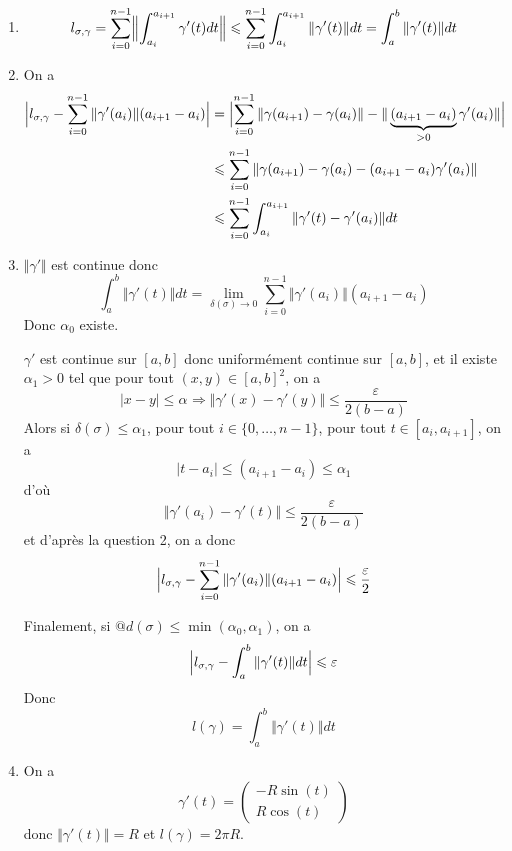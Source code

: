 \begin{solution}
	\phantom{}
	\begin{enumerate}
		\item 
		$$l_{\sigma,\gamma}=\sum_{i=0}^{n-1}\Bigl\Vert\int_{a_{i}}^{a_{i+1}}\gamma'(t)dt\Bigr\Vert\leqslant\sum_{i=0}^{n-1}\int_{a_{i}}^{a_{i+1}}\Vert\gamma'(t)\Vert dt=\int_{a}^{b}\Vert\gamma'(t)\Vert dt$$

		\item On a 
		\begin{align*}
			\Bigl\vert l_{\sigma,\gamma}-\sum_{i=0}^{n-1}\Vert\gamma'(a_{i})\Vert(a_{i+1}-a_{i})\Bigr\vert
			&=\Bigl\vert\sum_{i=0}^{n-1}\Vert\gamma(a_{i+1})-\gamma(a_{i})\Vert-\Vert\underbrace{(a_{i+1}-a_{i})}_{>0}\gamma'(a_{i})\Vert\Bigr\vert\\
			&\leqslant\sum_{i=0}^{n-1}\Vert\gamma(a_{i+1})-\gamma(a_{i})-(a_{i+1}-a_{i})\gamma'(a_{i})\Vert\\
			&\leqslant\sum_{i=0}^{n-1}\int_{a_{i}}^{a_{i+1}}\Vert\gamma'(t)-\gamma'(a_{i})\Vert dt
		\end{align*}

		\item $\Vert\gamma'\Vert$ est continue donc 
		$$\int_{a}^{b}\Vert\gamma'(t)\Vert dt=\lim\limits_{\delta(\sigma)\to0}\sum_{i=0}^{n-1}\Vert\gamma'(a_{i})\Vert(a_{i+1}-a_{i})$$
		Donc $\alpha_{0}$ existe.

		$\gamma'$ est continue sur $[a,b]$ donc uniformément continue sur $[a,b]$, et il existe $\alpha_{1}>0$ tel que pour tout $(x,y)\in[a,b]^{2}$, on a 
		$$\vert x-y\vert\leqslant\alpha_{}\Rightarrow\Vert\gamma'(x)-\gamma'(y)\Vert\leqslant\frac{\varepsilon}{2(b-a)}$$
		Alors si $\delta(\sigma)\leqslant\alpha_{1}$, pour tout $i\in\{0,\dots,n-1\}$, pour tout $t\in[a_{i},a_{i+1}]$, on a
		$$\vert t-a_{i}\vert\leqslant(a_{i+1}-a_{i})\leqslant\alpha_{1}$$
		d'où 
		$$\Vert \gamma'(a_{i})-\gamma'(t)\Vert\leqslant\frac{\varepsilon}{2(b-a)}$$
		et d'après la question 2, on a donc 
		$$\Bigl\vert l_{\sigma,\gamma}-\sum_{i=0}^{n-1}\Vert\gamma'(a_{i})\Vert(a_{i+1}-a_{i})\Bigr\vert\leqslant\frac{\varepsilon}{2}$$

		Finalement, si $@d(\sigma)\leqslant\min(\alpha_{0},\alpha_{1})$, on a 
		$$\Bigl\vert l_{\sigma,\gamma}-\int_{a}^{b}\Vert\gamma'(t)\Vert dt\Bigr\vert\leqslant\varepsilon$$
		Donc 
		$$l(\gamma)=\int_{a}^{b}\Vert\gamma'(t)\Vert dt$$

		\item On a 
		$$\gamma'(t)=\begin{pmatrix}
			-R\sin(t)\\
			R\cos(t)
		\end{pmatrix}$$
		donc $\Vert\gamma'(t)\Vert=R$ et $l(\gamma)=2\pi R$.
	\end{enumerate}
\end{solution}

